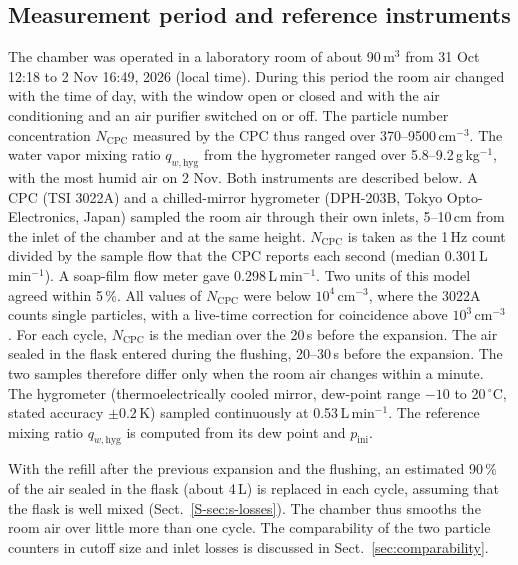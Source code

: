 \documentclass[preprint,review,12pt,authoryear]{elsarticle}
\begin{document}
\subsection{Measurement period and reference instruments}
\label{sec:reference}
The chamber was operated in a laboratory room of about 90\,m$^3$ from 31 Oct 12:18 to 2 Nov 16:49,
2026 (local time).
During this period the room air changed with the time of day, with the window open or closed and
with the air conditioning and an air purifier switched on or off.
The particle number concentration $N_\mathrm{CPC}$ measured by the CPC thus ranged over
370--9500\,cm$^{-3}$. The water vapor mixing ratio $q_{w,\mathrm{hyg}}$ from the hygrometer ranged over
5.8--9.2\,g\,kg$^{-1}$, with the most humid air on 2 Nov. Both instruments are described below.
A CPC (TSI 3022A) and a chilled-mirror
hygrometer (DPH-203B, Tokyo Opto-Electronics, Japan) sampled the room air through their own inlets,
5--10\,cm from the inlet of the chamber
and at the same height. $N_\mathrm{CPC}$ is taken as the 1\,Hz count divided by the sample
flow that the CPC reports each second (median 0.301\,L\,min$^{-1}$). A soap-film flow meter gave
0.298\,L\,min$^{-1}$. Two units of this
model agreed within 5\,\%. All values of $N_\mathrm{CPC}$ were below $10^4$\,cm$^{-3}$, where the
3022A counts single particles, with a live-time correction for coincidence above $10^3$\,cm$^{-3}$
\citep{sem2002design}.
For each cycle, $N_\mathrm{CPC}$ is the median over the 20\,s before
the expansion. The air sealed in the flask entered during the flushing, 20--30\,s before the expansion. The
two samples therefore differ only when the room air changes within a minute. The hygrometer
(thermoelectrically cooled mirror, dew-point
range $-10$ to 20\,$^\circ$C, stated accuracy $\pm0.2$\,K) sampled continuously at 0.53\,L\,min$^{-1}$.
The reference mixing ratio $q_{w,\mathrm{hyg}}$ is computed from its dew point and $p_\mathrm{ini}$.


With the refill after the previous expansion and the flushing, an estimated 90\,\% of the air sealed
in the flask (about 4\,L) is replaced in each cycle, assuming that the flask is well mixed
(Sect.~\ref{S-sec:s-losses}). The chamber thus smooths the room air over little more than one cycle.
The comparability of the two particle counters in cutoff size and inlet losses is discussed in
Sect.~\ref{sec:comparability}.
\end{document}
